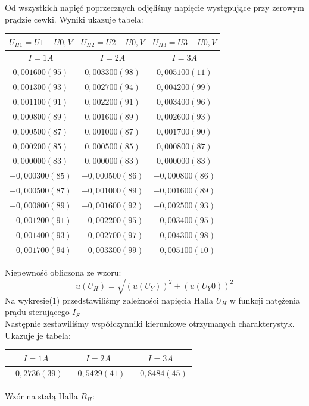 \documentclass{article}
\begin{document}
Od wszystkich napięć poprzecznych odjęliśmy napięcie występujące przy zerowym prądzie cewki. Wyniki ukazuje tabela:
\begin{center}
    \begin{tabular}{|c|c|c|}\hline
$U_{H1}=U1-U0, V$ & $U_{H2}=U2-U0, V$ & $U_{H3}=U3-U0, V$ \\ \hline
$I = 1A$ & $I = 2A$ & $I = 3A$ \\ \hline 
$0,001600(95)$ & $0,003300(98)$ & $0,005100(11)$ \\ \hline
$0,001300(93)$ & $0,002700(94)$ & $0,004200(99)$ \\ \hline
$0,001100(91)$ & $0,002200(91)$ & $0,003400(96)$ \\ \hline
$0,000800(89)$ & $0,001600(89)$ & $0,002600(93)$ \\ \hline
$0,000500(87)$ & $0,001000(87)$ & $0,001700(90)$ \\ \hline
$0,000200(85)$ & $0,000500(85)$ & $0,000800(87)$ \\ \hline
$0,000000(83)$ & $0,000000(83)$ & $0,000000(83)$ \\ \hline
$-0,000300(85)$ & $-0,000500(86)$ & $-0,000800(86)$ \\ \hline
$-0,000500(87)$ & $-0,001000(89)$ & $-0,001600(89)$ \\ \hline
$-0,000800(89)$ & $-0,001600(92)$ & $-0,002500(93)$ \\ \hline
$-0,001200(91)$ & $-0,002200(95)$ & $-0,003400(95)$ \\ \hline
$-0,001400(93)$ & $-0,002700(97)$ & $-0,004300(98)$ \\ \hline
$-0,001700(94)$ & $-0,003300(99)$ & $-0,005100(10)$ \\ \hline
    \end{tabular}
\end{center}
Niepewność obliczona ze wzoru:
$$u(U_H) = \sqrt{(u(U_Y))^2+(u(U_Y0))^2}$$
Na wykresie(1) przedstawiliśmy zależności napięcia Halla $U_H$ w funkcji natężenia prądu sterującego $I_S$\\
Następnie zestawiliśmy współczynniki kierunkowe otrzymanych charakterystyk. Ukazuje je tabela:
\begin{center}
    \begin{tabular}{|c|c|c|}\hline
$I = 1A$ & $I = 2A$ & $I = 3A$ \\ \hline 
$-0,2736(39)$ & $-0,5429(41)$ & $-0,8484(45)$\\ \hline
    \end{tabular}
\end{center}
Wzór na stałą Halla $R_H$:
\end{document}
